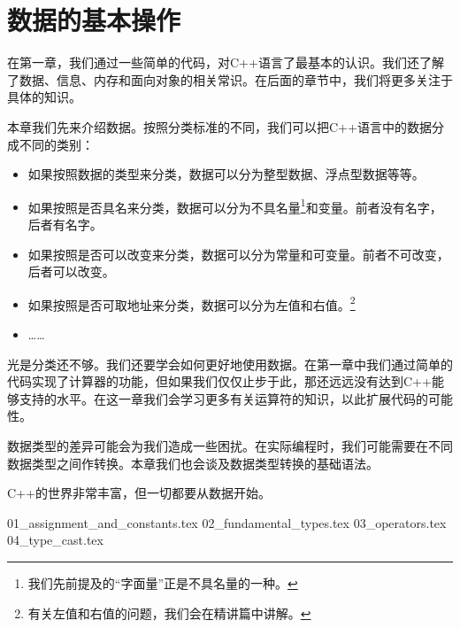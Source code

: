\chapter{数据的基本操作}
在第一章，我们通过一些简单的代码，对C++语言了最基本的认识。我们还了解了数据、信息、内存和面向对象的相关常识。在后面的章节中，我们将更多关注于具体的知识。\par
本章我们先来介绍数据。按照分类标准的不同，我们可以把C++语言中的数据分成不同的类别：
\begin{itemize}
    \item 如果按照数据的类型来分类，数据可以分为整型数据、浮点型数据等等。
    \item 如果按照是否具名来分类，数据可以分为不具名量\footnote{我们先前提及的``字面量''正是不具名量的一种。}和变量。前者没有名字，后者有名字。
    \item 如果按照是否可以改变来分类，数据可以分为常量和可变量。前者不可改变，后者可以改变。
    \item 如果按照是否可取地址来分类，数据可以分为左值和右值。\footnote{有关左值和右值的问题，我们会在精讲篇中讲解。}
    \item \ldots\ldots
\end{itemize}\par
光是分类还不够。我们还要学会如何更好地使用数据。在第一章中我们通过简单的代码实现了计算器的功能，但如果我们仅仅止步于此，那还远远没有达到C++能够支持的水平。在这一章我们会学习更多有关运算符的知识，以此扩展代码的可能性。\par
数据类型的差异可能会为我们造成一些困扰。在实际编程时，我们可能需要在不同数据类型之间作转换。本章我们也会谈及数据类型转换的基础语法。\par
C++的世界非常丰富，但一切都要从数据开始。\par
{01_assignment_and_constants.tex}
{02_fundamental_types.tex}
{03_operators.tex}
{04_type_cast.tex}
